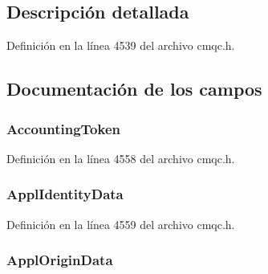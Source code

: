 \subsection{Descripción detallada}


Definición en la línea 4539 del archivo cmqc.\+h.



\subsection{Documentación de los campos}
\hypertarget{structtag_m_q_m_d1_a1fe2835a002ec01b58d479509699dd2c}{}
\subsubsection[{Accounting\+Token}]{ Accounting\+Token}\label{structtag_m_q_m_d1_a1fe2835a002ec01b58d479509699dd2c}


Definición en la línea 4558 del archivo cmqc.\+h.

\hypertarget{structtag_m_q_m_d1_a1f16948c5ba6adfbb92776400030700e}{}
\subsubsection[{Appl\+Identity\+Data}]{ Appl\+Identity\+Data}\label{structtag_m_q_m_d1_a1f16948c5ba6adfbb92776400030700e}


Definición en la línea 4559 del archivo cmqc.\+h.

\hypertarget{structtag_m_q_m_d1_aaf3c543f992b06c609193929872b998a}{}
\subsubsection[{Appl\+Origin\+Data}]{ Appl\+Origin\+Data}\label{structtag_m_q_m_d1_aaf3c543f992b06c609193929872b998a}


